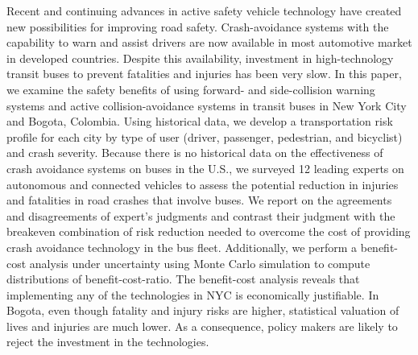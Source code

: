 Recent and continuing advances in active safety vehicle technology have created new possibilities for improving road safety. Crash-avoidance systems with the capability to warn and assist drivers are now available in most automotive market in developed countries. Despite this availability, investment in high-technology transit buses to prevent fatalities and injuries has been very slow. In this paper, we examine the safety benefits of using forward- and side-collision warning systems and active collision-avoidance systems in transit buses in New York City and Bogota, Colombia. Using historical data, we develop a transportation risk profile for each city by type of user (driver, passenger, pedestrian, and bicyclist) and crash severity. Because there is no historical data on the effectiveness of crash avoidance systems on buses in the U.S., we surveyed 12 leading experts on autonomous and connected vehicles to assess the potential reduction in injuries and fatalities in road crashes that involve buses. We report on the agreements and disagreements of expert’s judgments and contrast their judgment with the breakeven combination of risk reduction needed to overcome the cost of providing crash avoidance technology in the bus fleet. Additionally, we perform a benefit-cost analysis under uncertainty using Monte Carlo simulation to compute distributions of benefit-cost-ratio. The benefit-cost analysis reveals that implementing any of the technologies in {NYC} is economically justifiable. In Bogota, even though fatality and injury risks are higher, statistical valuation of lives and injuries are much lower. As a consequence, policy makers are likely to reject the investment in the technologies.
